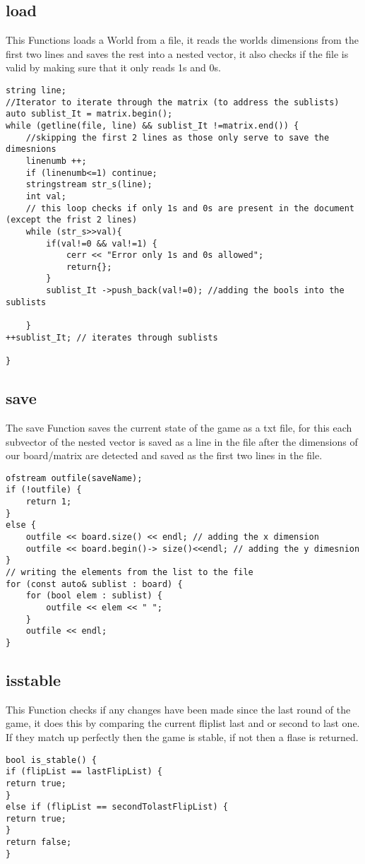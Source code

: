 \documentclass[a4paper]{article}
\begin{document}
\subsection{load}
This Functions loads a World from a file, it reads the worlds dimensions from the first two lines and saves the rest into a nested vector, it also checks if the file is valid by making sure that it only reads 1s and 0s.
\begin{lstlisting}[caption={main loop of the load function}]
string line;
//Iterator to iterate through the matrix (to address the sublists)
auto sublist_It = matrix.begin();
while (getline(file, line) && sublist_It !=matrix.end()) {
    //skipping the first 2 lines as those only serve to save the dimesnions
    linenumb ++;
    if (linenumb<=1) continue;
    stringstream str_s(line);
    int val;
    // this loop checks if only 1s and 0s are present in the document (except the frist 2 lines)
    while (str_s>>val){
        if(val!=0 && val!=1) {
            cerr << "Error only 1s and 0s allowed";
            return{};
        }
        sublist_It ->push_back(val!=0); //adding the bools into the sublists
    
    }
++sublist_It; // iterates through sublists

}
\end{lstlisting}
\clearpage
\subsection{save}
The save Function saves the current state of the game as a txt file, for this each subvector of the nested vector is saved as a line in the file after the dimensions of our board/matrix are detected and saved as the first two lines in the file.
\begin{lstlisting}
ofstream outfile(saveName);
if (!outfile) {
    return 1;
}
else {
    outfile << board.size() << endl; // adding the x dimension
    outfile << board.begin()-> size()<<endl; // adding the y dimesnion
}
// writing the elements from the list to the file
for (const auto& sublist : board) {
    for (bool elem : sublist) {
        outfile << elem << " ";
    }
    outfile << endl;
}
\end{lstlisting}
\subsection{isstable}
This Function checks if any changes have been made since the last round of the game, it does this by comparing the current fliplist last and or second to last one. If they match up perfectly then the game is stable, if not then a flase is returned.
\begin{lstlisting}
bool is_stable() {
if (flipList == lastFlipList) {
return true;
} 
else if (flipList == secondTolastFlipList) {
return true;
}
return false;
}
\end{lstlisting}
\clearpage
\end{document}

